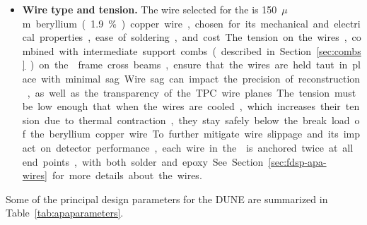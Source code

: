 \begin{itemize}
\item \textbf{Wire type and tension.}  The wire selected for the  is \SI{150}{$\mu$m} beryllium (\num{1.9}\%) copper wire, %
chosen for its mechanical and electrical properties, ease of soldering, and cost.  The tension on the wires, combined with intermediate support combs (described in Section~\ref{sec:combs}) on the  frame cross beams, ensure that the wires are held taut in place with minimal sag.  Wire sag can impact the precision of reconstruction, as well as the transparency of the TPC wire planes.  The tension must be low enough that when the wires are cooled, which increases their tension due to thermal contraction, they stay safely below the break load of the beryllium copper wire.  To further mitigate wire slippage and its impact on detector performance, each wire in the  is anchored twice at all end points, with both solder and epoxy.  See Section~\ref{sec:fdsp-apa-wires} for more details about the wires.
\end{itemize}

Some of the principal design parameters for the DUNE 
 are summarized in Table~\ref{tab:apaparameters}.

